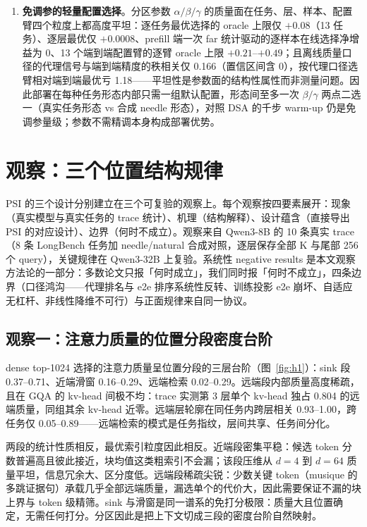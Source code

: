 \documentclass[11pt]{article}
\begin{document}
\begin{enumerate}
\item \textbf{免调参的轻量配置选择}。分区参数 $\alpha/\beta/\gamma$ 的质量面在任务、层、样本、配置臂四个粒度上都高度平坦：逐任务最优选择的 oracle 上限仅 $+0.08$（13 任务）、逐层最优仅 $+0.0008$、prefill 端一次 far 统计驱动的逐样本在线选择净增益为 0、13 个端到端配置臂的逐臂 oracle 上限 $+0.21$--$+0.49$；且离线质量口径的代理信号与端到端精度的秩相关仅 0.166（置信区间含 0），按代理口径选臂相对端到端最优亏 1.18——平坦性是参数面的结构性属性而非测量问题。因此部署在每种任务形态内部只需一组默认配置，形态间至多一次 $\beta/\gamma$ 两点二选一（真实任务形态 vs 合成 needle 形态），对照 DSA 的千步 warm-up 仍是免调参量级；参数不需精调本身构成部署优势。
\end{enumerate}

\section{观察：三个位置结构规律}\label{sec:obs}

PSI 的三个设计分别建立在三个可复验的观察上。每个观察按四要素展开：现象（真实模型与真实任务的 trace 统计）、机理（结构解释）、设计蕴含（直接导出 PSI 的对应设计）、边界（何时不成立）。观察来自 Qwen3-8B 的 10 条真实 trace（8 条 LongBench 任务加 needle/natural 合成对照，逐层保存全部 K 与尾部 256 个 query），关键规律在 Qwen3-32B 上复验。系统性 negative results 是本文观察方法论的一部分：多数论文只报「何时成立」，我们同时报「何时不成立」，四条边界（口径鸿沟——代理排名与 e2e 排序系统性反转、训练投影 e2e 崩坏、自适应无杠杆、非线性降维不可行）与正面规律来自同一协议。

\subsection{观察一：注意力质量的位置分段密度台阶}\label{sec:obsa}

dense top-1024 选择的注意力质量呈位置分段的三层台阶（图~\ref{fig:h1}）：sink 段 0.37--0.71、近端滑窗 0.16--0.29、远端检索 0.02--0.29。远端段内部质量高度稀疏，且在 GQA 的 kv-head 间极不均：trace 实测第 3 层单个 kv-head 独占 0.804 的远端质量，同组其余 kv-head 近零。远端层轮廓在同任务内跨层相关 0.93--1.00，跨任务仅 0.05--0.89——远端检索的模式是任务指纹，层间共享、任务间分化。

两段的统计性质相反，最优索引粒度因此相反。近端段密集平稳：候选 token 分数普遍高且彼此接近，块均值这类粗索引不会漏；该段压维从 $d{=}4$ 到 $d{=}64$ 质量平坦，信息冗余大、区分度低。远端段稀疏尖锐：少数关键 token（musique 的多跳证据句）承载几乎全部远端质量，漏选单个的代价大，因此需要保证不漏的块上界与 token 级精筛。sink 与滑窗是同一谱系的免打分极限：质量大且位置确定，无需任何打分。分区因此是把上下文切成三段的密度台阶自然映射。
\end{document}
